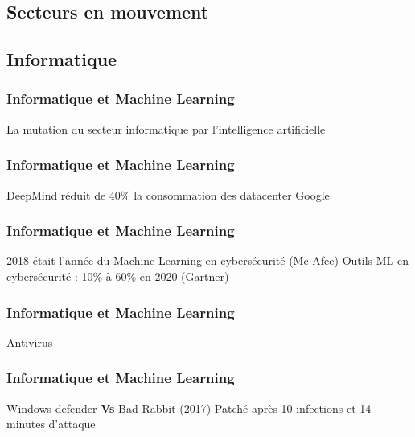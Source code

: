 \subsection{Secteurs en mouvement}
\subsection{Informatique}

\begin{frame}
  \frametitle{Informatique et Machine Learning}
  La mutation du secteur informatique par l'intelligence artificielle
\end{frame}

\begin{frame}
  \frametitle{Informatique et Machine Learning}
  DeepMind réduit de 40\% la consommation des datacenter Google
\end{frame}

\begin{frame}
  \frametitle{Informatique et Machine Learning}
  2018 était l'année du Machine Learning en cybersécurité (Mc Afee)
  \newline
  Outils ML en cybersécurité : 10\% à 60\% en 2020 (Gartner)
\end{frame}

\begin{frame}
  \frametitle{Informatique et Machine Learning}
  Antivirus 
  \newline
  \newline
  \begin{minipage}[c]{0.49\linewidth}
  \end{minipage}\hfill
  \begin{minipage}[c]{0.49\linewidth}
  \end{minipage}\hfill
\end{frame}

\begin{frame}
  \frametitle{Informatique et Machine Learning}
  Windows defender \textbf{Vs} Bad Rabbit (2017)
  \newline
  Patché après 10 infections et 14 minutes d'attaque
  \newline
  \newline
  \begin{minipage}[c]{0.49\linewidth}
  \end{minipage}\hfill
  \begin{minipage}[c]{0.49\linewidth}
  \end{minipage}\hfill
\end{frame}

